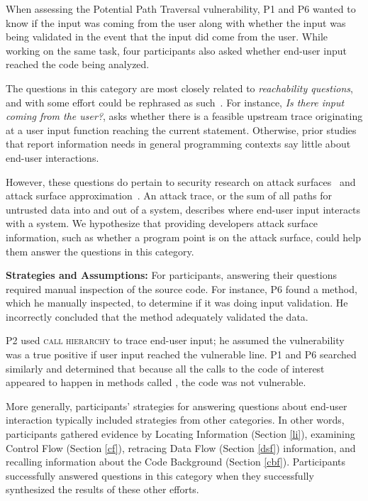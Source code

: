 \documentclass[10pt,journal,compsoc]{IEEEtran}
\begin{document}
 
When assessing the Potential Path Traversal vulnerability, P1 and P6 wanted to know if the input was coming from the user along with whether the input was being validated in the event that the input did come from the user.
While working on the same task, four participants also asked whether end-user input reached the code being analyzed.

The questions in this category are most closely related to \textit{reachability questions}, and with some effort could be rephrased as such~\cite{latoza2010developers}.
For instance, \emph{Is there input coming from the user?}, asks whether there is a feasible upstream trace originating at a user input function reaching the current statement.
Otherwise, prior studies that report information needs in general programming contexts say little about end-user interactions.

However, these questions do pertain to security research on attack surfaces~\cite{howard2005measuring} and attack surface approximation~\cite{theisen2015approximating}.
An attack trace, or the sum of all paths for untrusted data into and out of a system, describes where end-user input interacts with a system.
We hypothesize that providing developers attack surface information, such as whether a program point is on the attack surface, could help them answer the questions in this category.






\textbf{Strategies and Assumptions:}
For participants, answering their questions required manual inspection of the source code. 
For instance, P6 found a  method, which he manually inspected, to determine if it was doing input validation.
He incorrectly concluded that the  method adequately validated the data.

P2 used \textsc{call hierarchy} to trace end-user input; he assumed the vulnerability was a true positive if user input reached the vulnerable line.
P1 and P6 searched similarly and determined that because all the calls to the code of interest appeared to happen in methods called , the code was not vulnerable.


More generally, participants' strategies for answering questions about end-user interaction typically included strategies from other categories. 
In other words, participants gathered evidence by Locating Information (Section \ref{li}), examining Control Flow (Section \ref{cf}), retracing Data Flow (Section \ref{dsf}) information, and recalling information about the Code Background (Section \ref{cbf}). 
Participants successfully answered questions in this category when they successfully synthesized the results of these other efforts.
\end{document}
